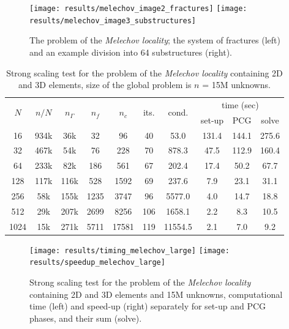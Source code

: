 \begin{figure}[ptbh]
\begin{center}
\texttt{[image: results/melechov\_image2\_fractures]} 
\texttt{[image: results/melechov\_image3\_substructures]}
\end{center}
\caption{\label{fig:melechov_2}The problem of the \emph{Melechov locality}; the system of fractures
(left) and an example division into 64 substructures (right).}
\end{figure}

\begin{table}[ptbh]
\begin{center}
\begin{tabular}
[c]{|cc|ccc|cc|ccc|}\hline
\multirow{2}{*}{$N$} & \multirow{2}{*}{$n/N$} &
\multirow{2}{*}{$n_{\Gamma}$} & \multirow{2}{*}{$n_f$} &
\multirow{2}{*}{$n_c$} & \multirow{2}{*}{its.} & \multirow{2}{*}{cond.} &
\multicolumn{3}{c|}{time (sec)}\\
&  &  &  &  &  &  & set-up & PCG & solve\\\hline
16 & 934k & 36k & 32 & 96 & 40 & 53.0 & 131.4 & 144.1 & 275.6\\
32 & 467k & 54k & 76 & 228 & 70 & 878.3 & 47.5 & 112.9 & 160.4\\
64 & 233k & 82k & 186 & 561 & 67 & 202.4 & 17.4 & 50.2 & 67.7\\
128 & 117k & 116k & 528 & 1592 & 69 & 237.6 & 7.9 & 23.1 & 31.1\\
256 & 58k & 155k & 1235 & 3747 & 96 & 5577.0 & 4.0 & 14.7 & 18.8\\
512 & 29k & 207k & 2699 & 8256 & 106 & 1658.1 & 2.2 & 8.3 & 10.5\\
1024 & 15k & 271k & 5711 & 17581 & 119 & 11554.5 & 2.1 & 7.0 & 9.2\\\hline
\end{tabular}
\end{center}
\caption{\label{tab:melechov_large_strong_scaling}
Strong scaling test for the problem of the \emph{Melechov locality}
containing 2D and 3D elements, size of the global problem is $n$ = 15M
unknowns.}
\end{table}

\begin{figure}[ptbh]
\begin{center}
\texttt{[image: results/timing\_melechov\_large]} 
\texttt{[image: results/speedup\_melechov\_large]}
\end{center}
\caption{\label{fig:timing_Melechov_large}
Strong scaling test for the problem of the \emph{Melechov locality}
containing 2D and 3D elements and 15M unknowns, computational time (left) and
speed-up (right) separately for set-up and PCG phases, and their sum (solve).}
\end{figure}

